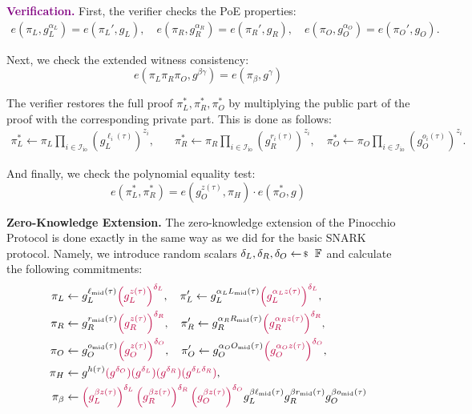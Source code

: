 \documentclass[../../book.tex]{subfiles}
\begin{document}
\textcolor{purple}{\textbf{Verification.}} First, the verifier checks the PoE properties:
\begin{align*}
    e(\pi_L, g_L^{\alpha_L}) = e(\pi_L', g_L), \quad e(\pi_R, g_R^{\alpha_R}) = e(\pi_R', g_R), \quad e(\pi_O, g_O^{\alpha_O}) = e(\pi_O', g_O).
\end{align*}

Next, we check the extended witness consistency:
\begin{equation*}
    e(\pi_L\pi_R\pi_O, g^{\beta\gamma}) = e(\pi_{\beta}, g^{\gamma})
\end{equation*}

The verifier restores the full proof $\pi_L^*,\pi_R^*,\pi_O^*$ by multiplying the public part of the proof with the corresponding private part. This is done as follows:
\begin{align*}
    \pi_L^* \gets \pi_L\prod_{i \in \mathcal{I}_{\text{io}}} (g_L^{\ell_i(\tau)})^{z_i}, & \quad \pi_R^* \gets \pi_R\prod_{i \in \mathcal{I}_{\text{io}}} (g_R^{r_i(\tau)})^{z_i}, \quad \pi_O^* \gets \pi_O\prod_{i \in \mathcal{I}_{\text{io}}} (g_O^{o_i(\tau)})^{z_i}.
\end{align*}

And finally, we check the polynomial equality test:
\begin{equation*}
    e(\pi_L^*, \pi_R^*) = e(g_O^{z(\tau)}, \pi_H)\cdot e(\pi_O^*, g)
\end{equation*}

\textcolor{blue!75!gray}{\textbf{Zero-Knowledge Extension.}} The zero-knowledge extension of the Pinocchio Protocol is done exactly in the same way as we did for the basic SNARK protocol. Namely, we introduce random scalars $\delta_L, \delta_R, \delta_O \leftarrowS \mathbb{F}$ and calculate the following commitments:
\begin{align*}
    \pi_L &\gets g_L^{\ell_{\text{mid}}(\tau)}\textcolor{purple}{\left(g_L^{z(\tau)}\right)^{\delta_L}}, \quad \pi_L' \gets g_L^{\alpha_LL_{\text{mid}}(\tau)}\textcolor{purple}{\left(g_L^{\alpha_L z(\tau)}\right)^{\delta_L}}, \\
    \pi_R &\gets g_R^{r_{\text{mid}}(\tau)}\textcolor{purple}{\left(g_R^{z(\tau)}\right)^{\delta_R}}, \quad \pi_R' \gets g_R^{\alpha_RR_{\text{mid}}(\tau)}\textcolor{purple}{\left(g_R^{\alpha_R z(\tau)}\right)^{\delta_R}}, \\
    \pi_O &\gets g_O^{o_{\text{mid}}(\tau)}\textcolor{purple}{\left(g_O^{z(\tau)}\right)^{\delta_O}}, \quad \pi_O' \gets g_O^{\alpha_OO_{\text{mid}}(\tau)}\textcolor{purple}{\left(g_O^{\alpha_O z(\tau)}\right)^{\delta_O}}, \\
    \pi_H &\gets g^{h(\tau)}\textcolor{purple}{(g^{\delta_O})(g^{\delta_L})(g^{\delta_R})(g^{\delta_L\delta_R})}, \\ 
    \pi_{\beta} &\gets \textcolor{purple}{\left(g_L^{\beta z(\tau)}\right)^{\delta_L}\left(g_R^{\beta z(\tau)}\right)^{\delta_R}\left(g_O^{\beta z(\tau)}\right)^{\delta_O}}g_L^{\beta \ell_{\text{mid}}(\tau)}g_R^{\beta r_{\text{mid}}(\tau)}g_O^{\beta o_{\text{mid}}(\tau)}
\end{align*}
\end{document}

